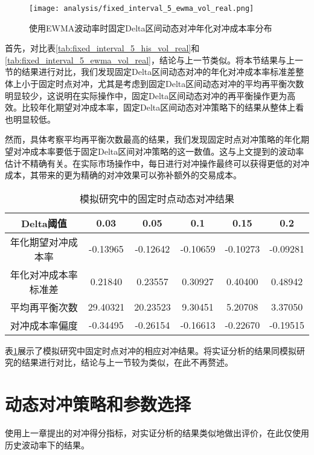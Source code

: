 \begin{figure}[htb]
  \centering
  \texttt{[image: analysis/fixed\_interval\_5\_ewma\_vol\_real.png]}
  \caption[这里将出现在插图索引中]
    {使用EWMA波动率时固定Delta区间动态对冲年化对冲成本率分布}
  \label{fig:fixed_interval_5_ewma_vol_real}
\end{figure}

首先，对比表\ref{tab:fixed_interval_5_his_vol_real}和\ref{tab:fixed_interval_5_ewma_vol_real}，结论与上一节类似。将本节结果与上一节的结果进行对比，我们发现固定Delta区间动态对冲的年化对冲成本率标准差整体上小于固定时点对冲，尤其是考虑到固定Delta区间动态对冲的平均再平衡次数明显较少，这说明在实际操作中，固定Delta区间动态对冲的再平衡操作更为高效。比较年化期望对冲成本率，固定Delta区间动态对冲策略下的结果从整体上看也明显较低。

然而，具体考察平均再平衡次数最高的结果，我们发现固定时点对冲策略的年化期望对冲成本率要低于固定Delta区间对冲策略的这一数值。这与上文提到的波动率估计不精确有关。在实际市场操作中，每日进行对冲操作最终可以获得更低的对冲成本，其带来的更为精确的对冲效果可以弥补额外的交易成本。

\begin{table}[htbp]
  \centering
  \caption{模拟研究中的固定时点动态对冲结果}
  \label{tab:fixed_interval_5_sim}
  \begin{tabular}{cccccc}
    \toprule
    Delta阈值 & 0.03 & 0.05 & 0.1 & 0.15 & 0.2 \\
    \midrule
    年化期望对冲成本率 & -0.13965 & -0.12642 & -0.10659 & -0.10273 & -0.09281 \\
    年化对冲成本率标准差 & 0.21840 & 0.23557 & 0.30927 & 0.40400 & 0.48942 \\
    平均再平衡次数 & 29.40321 & 20.23523 & 9.30451 & 5.20708 & 3.37050 \\
    对冲成本率偏度 & -0.34495 & -0.26154 & -0.16613 & -0.22670 & -0.19515 \\
    \bottomrule
  \end{tabular}
\end{table}

表\ref{tab:fixed_interval_5_sim}展示了模拟研究中固定时点对冲的相应对冲结果。将实证分析的结果同模拟研究的结果进行对比，结论与上一节较为类似，在此不再赘述。

\section{动态对冲策略和参数选择}

使用上一章提出的对冲得分指标，对实证分析的结果类似地做出评价，在此仅使用历史波动率下的结果。

